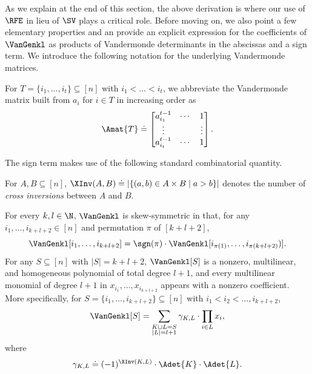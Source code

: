 As we explain at the end of this section, the above derivation is where our use of $\RFE$ in lieu of $\SV$ plays a critical role. Before moving on, we also point a few elementary properties and an provide an explicit expression for the coefficients of $\VanGenkl$ as products of Vandermonde determinants in the abscissas and a sign term. We introduce the following notation for the underlying Vandermonde matrices.
\begin{definition}
For $T=\{i_1, \dots, i_t\} \subseteq [n]$  with $i_1 < \dots < i_t$, we abbreviate the Vandermonde matrix built from $a_i$ for $i \in T$ in increasing order as
\begin{equation}
  \label{eq.vandermonde-rep}
  \Amat{T}
  \doteq
  \begin{bmatrix}
    a_{i_1}^{t-1} & \cdots & 1 \\
    \vdots & & \vdots \\
    a_{i_t}^{t-1} & \cdots & 1
  \end{bmatrix}.
\end{equation}
\end{definition}
The sign term makes use of the following standard combinatorial quantity.
\begin{definition}
For $A,B \subseteq [n]$, $\XInv(A,B) \doteq |\{ (a,b)\in A\times B \mid a>b \}|$ denotes the number of \emph{cross inversions} between $A$ and $B$.
\end{definition}
\begin{proposition}\label{prop.vangen.basic}
  For every \(k,l \in \N\), 
  \(\VanGenkl\) is skew-symmetric in that,
  for any \(i_1,\ldots,i_{k+l+2} \in [n]\) and permutation \(\pi\) of $[k+l+2]$,
  \[
    \VanGenkl[i_1,\ldots, i_{k+l+2}]
    =
    \sgn(\pi)\cdot
    \VanGenkl[i_{\pi(1)},\ldots,i_{\pi(k+l+2)})].
  \]
  For any $S \subseteq [n]$ with $|S|=k+l+2$, $\VanGenkl[S]$ is a nonzero, multilinear, and homogeneous polynomial of total degree \(l+1\),
  and every multilinear monomial of degree $l+1$ in
  \(x_{i_1},\ldots,x_{i_{k+l+2}}\) appears with a nonzero coefficient. More specifically, for $S = \{i_1, \dots, i_{k+l+2}\} \subseteq [n]$ with $i_1 < i_2 < \dots, i_{k+l+2}$,
  \begin{equation}
    \label{eq.EVC.expanded}
      \VanGenkl[S] = \sum_{\substack{K\sqcup L= S \\ |L|=l+1}}
      \gamma_{K,L} \cdot \prod_{i \in L} x_i,
  \end{equation}
  where
  \begin{equation} \label{eq-EVC-coef}
    \gamma_{K,L} \doteq (-1)^{\XInv(K,L)} \cdot \Adet{K} \cdot \Adet{L}.
\end{equation}    
\end{proposition}
